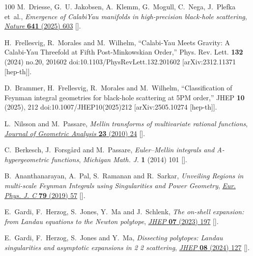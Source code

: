 \documentclass[12pt,a4paper]{article}
\theoremstyle{plain}
\theoremstyle{remark}
\begin{document}
\begin{thebibliography}{100}
M.~Driesse, G.~U. Jakobsen, A.~Klemm, G.~Mogull, C.~Nega, J.~Plefka et~al.,
  \emph{{Emergence of Calabi{\textendash}Yau manifolds in high-precision
  black-hole scattering}},
  \href{https://doi.org/10.1038/s41586-025-08984-2}{\emph{Nature} {\bfseries
  641} (2025) 603} [\href{https://arxiv.org/abs/2411.11846}{{}}].

H.~Frellesvig, R.~Morales and M.~Wilhelm,
``Calabi-Yau Meets Gravity: A Calabi-Yau Threefold at Fifth Post-Minkowskian Order,''
Phys. Rev. Lett. \textbf{132} (2024) no.20, 201602
doi:10.1103/PhysRevLett.132.201602
[arXiv:2312.11371 [hep-th]].

D.~Brammer, H.~Frellesvig, R.~Morales and M.~Wilhelm,
``Classification of Feynman integral geometries for black-hole scattering at 5PM order,''
JHEP \textbf{10} (2025), 212
doi:10.1007/JHEP10(2025)212
[arXiv:2505.10274 [hep-th]].

L.~{Nilsson} and M.~{Passare}, \emph{{Mellin transforms of multivariate
  rational functions}},
  \href{https://doi.org/10.1007/s12220-011-9235-7}{\emph{Journal of Geometric
  Analysis} {\bfseries 23} (2010) 24}
  [\href{https://arxiv.org/abs/1010.5060}{{}}].

C.~{Berkesch}, J.~{Forsg{\r{a}}rd} and M.~{Passare}, \emph{{Euler--Mellin
  integrals and A-hypergeometric functions}}, {\emph{Michigan Math. J.}
  {\bfseries 1} (2014) 101} [\href{https://arxiv.org/abs/1103.6273}{{}}].

B.~Ananthanarayan, A.~Pal, S.~Ramanan and R.~Sarkar, \emph{{Unveiling Regions
  in multi-scale Feynman Integrals using Singularities and Power Geometry}},
  \href{https://doi.org/10.1140/epjc/s10052-019-6533-x}{\emph{Eur. Phys. J. C}
  {\bfseries 79} (2019) 57} [\href{https://arxiv.org/abs/1810.06270}{{}}].

E.~Gardi, F.~Herzog, S.~Jones, Y.~Ma and J.~Schlenk, \emph{{The on-shell
  expansion: from Landau equations to the Newton polytope}},
  \href{https://doi.org/10.1007/JHEP07(2023)197}{\emph{JHEP} {\bfseries 07}
  (2023) 197} [\href{https://arxiv.org/abs/2211.14845}{{}}].

E.~Gardi, F.~Herzog, S.~Jones and Y.~Ma, \emph{{Dissecting polytopes: Landau
  singularities and asymptotic expansions in 2 \textrightarrow{} 2
  scattering}}, \href{https://doi.org/10.1007/JHEP08(2024)127}{\emph{JHEP}
  {\bfseries 08} (2024) 127}
  [\href{https://arxiv.org/abs/2407.13738}{{}}].


\end{thebibliography}
\end{document}

